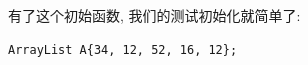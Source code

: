 \documentclass[a4paper]{ctexart}
\theoremstyle{definition}
\theoremstyle{definition}
\begin{document}
有了这个初始函数, 我们的测试初始化就简单了:
\begin{verbatim}
ArrayList A{34, 12, 52, 16, 12};
\end{verbatim}





\end{document}
